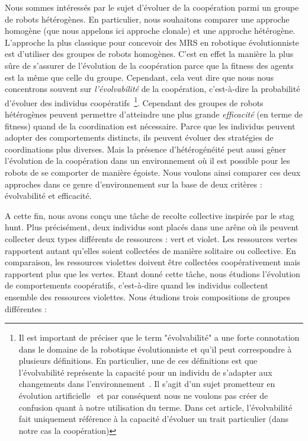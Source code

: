 			Nous sommes intéressés par le sujet d'évoluer de la coopération parmi un groupe de robots hétérogènes. En particulier, nous souhaitons comparer une approche homogène (que nous appelons ici approche clonale) et une approche hétérogène. L'approche la plus classique pour concevoir des MRS en robotique évolutionniste est d'utiliser des groupes de robots homogènes. C'est en effet la manière la plus sûre de s'assurer de l'évolution de la coopération parce que la fitness des agents est la même que celle du groupe. Cependant, cela veut dire que nous nous concentrons souvent sur \emph{l'évolvabilité} de la coopération, c'est-à-dire la probabilité d'évoluer des individus coopératifs~\footnote{Il est important de préciser que le term "évolvabilité" a une forte connotation dans le domaine de la robotique évolutionniste et qu'il peut correspondre à plusieurs définitions. En particulier, une de ces définitions est que l'évolvabilité représente la capacité pour un individu de s'adapter aux changements dans l'environnement~\parencite{Wagner1996}. Il s'agit d'un sujet prometteur en évolution artificielle~\parencite{Banzhaf2006, Lehman2013, Doncieux2015a, Taylor2016} et par conséquent nous ne voulons pas créer de confusion quant à notre utilisation du terme. Dans cet article, l'évolvabilité fait uniquement référence à la capacité d'évoluer un trait particulier (dans notre cas la coopération)}. Cependant des groupes de robots hétérogènes peuvent permettre d'atteindre une plus grande \emph{efficacité} (en terme de fitness) quand de la coordination est nécessaire. Parce que les individus peuvent adopter des comportements distincts, ils peuvent évoluer des stratégies de coordinations plus diverses. Mais la présence d'hétérogénéité peut aussi gêner l'évolution de la coopération dans un environnement où il est possible pour les robots de se comporter de manière égoiste. Nous voulons ainsi comparer ces deux approches dans ce genre d'environnement sur la base de deux critères : évolvabilité et efficacité.

			A cette fin, nous avons conçu une tâche de recolte collective inspirée par le stag hunt. Plus précisément, deux individus sont placés dans une arêne où ils peuvent collecter deux types différents de ressources : vert et violet. Les ressources vertes rapportent autant qu'elles soient collectées de manière solitaire ou collective. En comparaison, les ressources violettes doivent être collectées coopérativement mais rapportent plus que les vertes. Etant donné cette tâche, nous étudions l'évolution de comportements coopératifs, c'est-à-dire quand les individus collectent ensemble des ressources violettes. Nous étudions trois compositions de groupes différentes :

